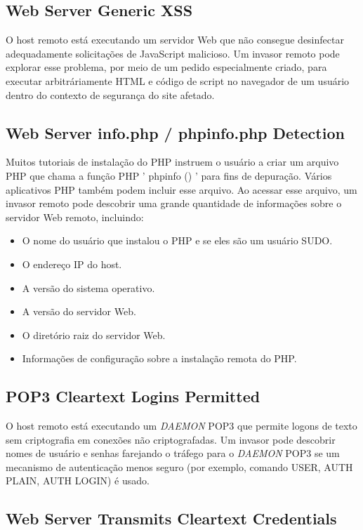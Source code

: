 \documentclass[
	12pt,				%
	openright,			%
	twoside,			%
	a4paper,			%
	english,			%
	french,				%
	spanish,			%
	brazil				%
	]{abntex2}
\begin{document}
	\subsection{Web Server Generic XSS}
	 O host remoto está executando um servidor Web que não consegue desinfectar adequadamente solicitações de JavaScript malicioso. Um invasor remoto pode explorar esse problema, por meio de um pedido especialmente criado, para executar arbitráriamente HTML e código de script no navegador de um usuário dentro do contexto de segurança do site afetado.

\subsection{Web Server info.php / phpinfo.php Detection}

	 Muitos tutoriais de instalação do PHP instruem o usuário a criar um arquivo PHP que chama a função PHP ' phpinfo () ' para fins de depuração. Vários aplicativos PHP também podem incluir esse arquivo.  Ao acessar esse arquivo, um invasor remoto pode descobrir uma grande quantidade de informações sobre o servidor Web remoto, incluindo:
	 \begin{itemize}
	 	\item O nome do usuário que instalou o PHP e se eles são um usuário SUDO.
	 	\item O endereço IP do host.
	 	\item A versão do sistema operativo.
	 	\item A versão do servidor Web.
	 	\item O diretório raiz do servidor Web.
	 	\item Informações de configuração sobre a instalação remota do PHP.
	 \end{itemize}

\subsection{POP3 Cleartext Logins Permitted}

 	O host remoto está executando um \textit{DAEMON} POP3 que permite logons de texto sem criptografia em conexões não criptografadas. Um invasor pode descobrir nomes de usuário e senhas farejando o tráfego para o \textit{DAEMON} POP3 se um mecanismo de autenticação menos seguro (por exemplo, comando USER, AUTH PLAIN, AUTH LOGIN) é usado.

\subsection{Web Server Transmits Cleartext Credentials}
\end{document}
